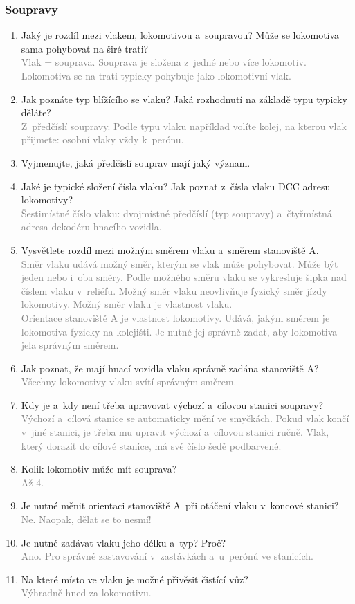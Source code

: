 \documentclass[12pt,a4paper]{article}
\newcommand{\solution}[1]{\\ \textcolor{gray}{#1}}
\newcommand{\solution}[1]{}
\begin{document}
\subsubsection*{Soupravy}
\begin{enumerate}[leftmargin=*]
\item Jaký je rozdíl mezi vlakem, lokomotivou a~soupravou? Může se lokomotiva
sama pohybovat na širé trati?
\solution{Vlak = souprava. Souprava je složena z~jedné nebo více lokomotiv.
Lokomotiva se na trati typicky pohybuje jako lokomotivní vlak.}

\item Jak poznáte typ blížícího se vlaku? Jaká rozhodnutí na základě typu
typicky děláte?
\solution{Z~předčíslí soupravy. Podle typu vlaku například volíte kolej, na
kterou vlak přijmete: osobní vlaky vždy k~perónu.}

\item Vyjmenujte, jaká předčíslí souprav mají jaký význam.

\item Jaké je typické složení čísla vlaku? Jak poznat z~čísla vlaku DCC adresu
lokomotivy?
\solution{Šestimístné číslo vlaku: dvojmístné předčíslí (typ soupravy)
a~čtyřmístná adresa dekodéru hnacího vozidla.}

\item Vysvětlete rozdíl mezi možným směrem vlaku a~směrem stanoviště A.
\solution{Směr vlaku udává možný směr, kterým se vlak může pohybovat. Může být
jeden nebo i~oba směry. Podle možného směru vlaku se vykresluje šipka nad
číslem vlaku v~reliéfu. Možný směr vlaku neovlivňuje fyzický směr jízdy
lokomotivy. Možný směr vlaku je vlastnost vlaku. \\ Orientace stanoviště A je
vlastnost lokomotivy. Udává, jakým směrem je lokomotiva fyzicky na kolejišti.
Je nutné jej správně zadat, aby lokomotiva jela správným směrem.}

\item Jak poznat, že mají hnací vozidla vlaku správně zadána stanoviště A?
\solution{Všechny lokomotivy vlaku svítí správným směrem.}

\item Kdy je a~kdy není třeba upravovat výchozí a~cílovou stanici soupravy?
\solution{Výchozí a~cílová stanice se automaticky mění ve smyčkách. Pokud vlak
končí v~jiné stanici, je třeba mu upravit výchozí a~cílovou stanici ručně.
Vlak, který dorazit do cílové stanice, má své číslo šedě podbarvené.}

\item Kolik lokomotiv může mít souprava?
\solution{Až 4.}

\item Je nutné měnit orientaci stanoviště A~při otáčení vlaku v~koncové
stanici?
\solution{Ne. Naopak, dělat se to nesmí!}

\item Je nutné zadávat vlaku jeho délku a~typ? Proč?
\solution{Ano. Pro správné zastavování v~zastávkách a~u~perónů ve stanicích.}

\item Na které místo ve vlaku je možné přivěsit čistící vůz?
\solution{Výhradně hned za lokomotivu.}

\end{enumerate}
\end{document}
